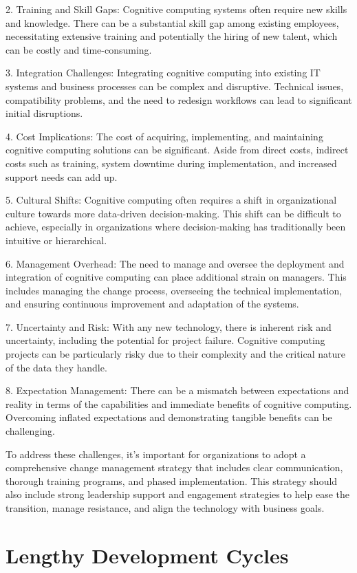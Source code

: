 \documentclass{article}
\begin{document}
2. Training and Skill Gaps: Cognitive computing systems often require new skills and knowledge. There can be a substantial skill gap among existing employees, necessitating extensive training and potentially the hiring of new talent, which can be costly and time-consuming.

3. Integration Challenges: Integrating cognitive computing into existing IT systems and business processes can be complex and disruptive. Technical issues, compatibility problems, and the need to redesign workflows can lead to significant initial disruptions.

4. Cost Implications: The cost of acquiring, implementing, and maintaining cognitive computing solutions can be significant. Aside from direct costs, indirect costs such as training, system downtime during implementation, and increased support needs can add up.

5. Cultural Shifts: Cognitive computing often requires a shift in organizational culture towards more data-driven decision-making. This shift can be difficult to achieve, especially in organizations where decision-making has traditionally been intuitive or hierarchical.

6. Management Overhead: The need to manage and oversee the deployment and integration of cognitive computing can place additional strain on managers. This includes managing the change process, overseeing the technical implementation, and ensuring continuous improvement and adaptation of the systems.

7. Uncertainty and Risk: With any new technology, there is inherent risk and uncertainty, including the potential for project failure. Cognitive computing projects can be particularly risky due to their complexity and the critical nature of the data they handle.

8. Expectation Management: There can be a mismatch between expectations and reality in terms of the capabilities and immediate benefits of cognitive computing. Overcoming inflated expectations and demonstrating tangible benefits can be challenging.

To address these challenges, it's important for organizations to adopt a comprehensive change management strategy that includes clear communication, thorough training programs, and phased implementation. This strategy should also include strong leadership support and engagement strategies to help ease the transition, manage resistance, and align the technology with business goals.

\section{Lengthy Development Cycles}
\end{document}
